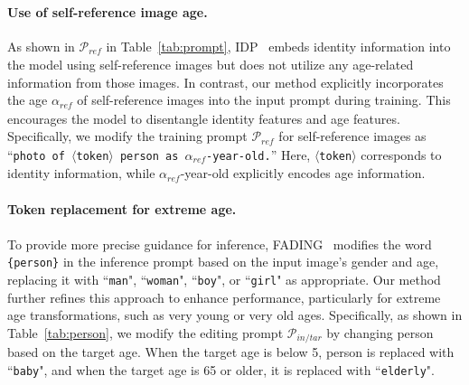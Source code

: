 \paragraph{Use of self-reference image age.}
As shown in $\mathcal{P}_\mathit{ref}$ in Table~\ref{tab:prompt}, IDP~\cite{banerjee2023identity} embeds identity information into the model using self-reference images but does not utilize any age-related information from those images.
In contrast, our method explicitly incorporates the age $\alpha_\mathit{ref}$ of self-reference images into the input prompt during training.
This encourages the model to disentangle identity features and age features.
Specifically, we modify the training prompt $\mathcal{P}_\mathit{ref}$ for self-reference images as 
``\texttt{photo of $\langle$token$\rangle$ person as $\alpha_\mathit{ref}$-year-old.}''
Here, \texttt{$\langle$token$\rangle$} corresponds to identity information, while $\alpha_\mathit{ref}$-year-old explicitly encodes age information.

\paragraph{Token replacement for extreme age.
}


To provide more precise guidance for inference, FADING~\cite{chen2023face} modifies the word \texttt{\{person\}} in the inference prompt based on the input image's gender and age, replacing it with ``\texttt{man}", ``\texttt{woman}", ``\texttt{boy}", or ``\texttt{girl}" as appropriate.
Our method further refines this approach to enhance performance, particularly for extreme age transformations, such as very young or very old ages. Specifically, as shown in Table~\ref{tab:person}, we modify the editing prompt $\mathcal{P}_\mathit{in/tar}$ by changing {person} based on the target age. When the target age is below 5, {person} is replaced with ``\texttt{baby}", and when the target age is 65 or older, it is replaced with ``\texttt{elderly}".
